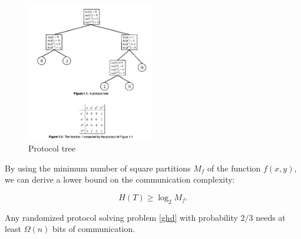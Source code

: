 \begin{figure}
  \centering
  \includegraphics[width=0.5\textwidth]{protocol_tree.png}
  \caption{Protocol tree\cite{kushilevitz1997communication}}
  \label{proto_tree}
\end{figure}

By using the minimum number of square partitions $M_f$ of the function $f(x,y)$, we can derive a lower bound on the communication complexity:

\[
H(T)\ge \log_2 M_f.
\]


\begin{thm}
\label{ghd_lower_bound}
    Any randomized protocol solving problem \ref{ghd} with probability $2/3$ needs at least $\Omega(n)$ bits of communication.
\end{thm}

